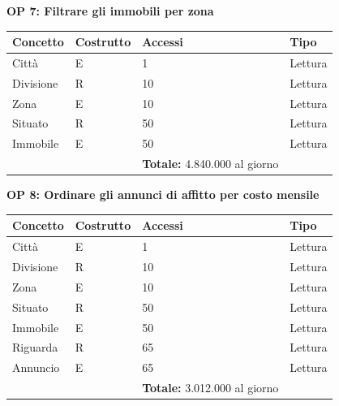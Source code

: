 \documentclass[a4paper,12pt]{report}
\begin{document}
            \textbf{OP 7: Filtrare gli immobili per zona}
        	\begin{table}[H]
            \centering
             \begin{tabular}{llll}
             \rowcolor{yellow!20} \textbf{Concetto} & \textbf{Costrutto} & \textbf{Accessi} & \textbf{Tipo}\\ [0.5ex] 
             \hline
             Città & E & 1 & Lettura \\ 
             Divisione & R & 10 & Lettura \\ 
             Zona & E & 10 & Lettura \\ 
             Situato & R & 50 & Lettura \\ 
             Immobile & E & 50 & Lettura \\
             \hline
                \rowcolor{yellow!20} &   & \textbf{Totale:}  4.840.000 al giorno &  \\ [1ex] 
             
             \end{tabular}
            \end{table}

            \textbf{OP 8: Ordinare gli annunci di affitto per costo mensile}
        	\begin{table}[H]
            \centering
             \begin{tabular}{llll}
             \rowcolor{yellow!20} \textbf{Concetto} & \textbf{Costrutto} & \textbf{Accessi} & \textbf{Tipo}\\ [0.5ex] 
             \hline
             Città & E & 1 & Lettura \\ 
             Divisione & R & 10 & Lettura \\ 
             Zona & E & 10 & Lettura \\ 
             Situato & R & 50 & Lettura \\ 
             Immobile & E & 50 & Lettura \\ 
             Riguarda & R & 65 & Lettura \\ 
             Annuncio & E & 65 & Lettura \\ 
             \hline
                \rowcolor{yellow!20} &   & \textbf{Totale:}  3.012.000 al giorno &  \\ [1ex] 
             
             \end{tabular}
            \end{table}
\end{document}
